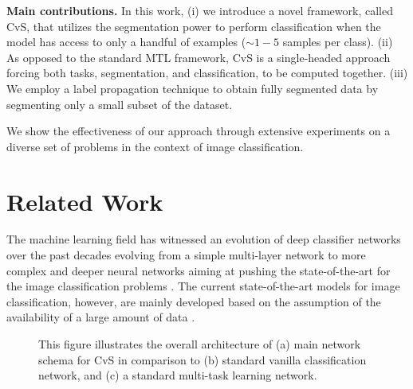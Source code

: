 \documentclass[conference]{IEEEtran}
\begin{document}
\textbf{Main contributions.} In this work, (i) we introduce a novel framework, called CvS, that utilizes the segmentation power to perform classification when the model has access to only a handful of examples ($\sim1-5$ samples per class). (ii) As opposed to the standard MTL framework, CvS is a single-headed approach forcing both tasks, segmentation, and classification, to be computed together. (iii) We employ a label propagation technique to obtain fully segmented data by segmenting only a small subset of the dataset. 

We show the effectiveness of our approach through extensive experiments on a diverse set of problems in the context of image classification.  
 
\section{Related Work}
The machine learning field has witnessed an evolution of deep classifier networks over the past decades evolving from a simple multi-layer network to more complex and deeper neural networks aiming at pushing the state-of-the-art for the image classification problems \cite{lecun1990handwritten,krizhevsky2012imagenet, simonyan2014very, szegedy2015going, szegedy2016rethinking, he2016deep, huang2017densely}. The current state-of-the-art models for image classification, however, are mainly developed based on the assumption of the availability of a large amount of data \cite{pham2020meta, foret2020sharpness, dosovitskiy2020image, byerly2020branching, mazzia2021efficient}. 
%
\begin{figure*}[ht]
\begin{center}
\end{center}
\begin{center}
\end{center}
\begin{center}
\end{center}
\caption{This figure illustrates the overall architecture of (a) main network schema for CvS in comparison to (b) standard vanilla classification network, and (c) a standard multi-task learning network.}
\label{fig:all_arch}
\end{figure*}
\end{document}
